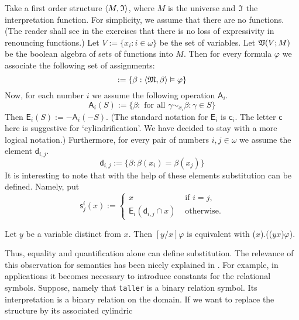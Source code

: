 Take a first order structure $\langle M, \mathfrak{I}\rangle$, where $M$ is the
universe and $\mathfrak{I}$ the interpretation function. For simplicity, we
assume that there are no functions. (The reader shall see in the
exercises that there is no loss of expressivity in renouncing
functions.) Let $V := \{x_i : i \in \omega\}$ be the set of
variables. Let $\mathfrak{V}(V;M)$ be the boolean algebra of sets of
functions into $M$. Then for every formula $\varphi$ we
associate the following set of assignments:
\begin{equation}
[\varphi] := \{\beta : \auf \GM, \beta\zu \vDash \varphi\}
\end{equation}
Now, for each number $i$ we assume the following operation $\mathsf{A}_i$.
\begin{equation}
\mathsf{A}_i(S) := \{\beta : \mbox{ for all }\gamma
\sim_{x_i} \beta: \gamma \in S\}
\end{equation}
Then $\mathsf{E}_i(S) := - \mathsf{A}_i(- S)$. (The standard
notation for $\mathsf{E}_i$ is $\mathsf{c}_i$. The letter
$\mathsf{c}$ here is suggestive for `cylindrification'. We have decided
to stay with a more logical notation.) Furthermore, for every pair of
numbers $i, j \in \omega$ we assume the element $\mathsf{d}_{i,j}$.
\begin{equation}
\mathsf{d}_{i,j} := \{\beta :  \beta(x_i) = \beta(x_j)\}
\end{equation}
It is interesting to note that with the help of these elements
substitution can be defined. Namely, put
\begin{equation}
\mathsf{s}^{i}_{j}(x) := 
    \begin{cases}
    x & \text{ if $i = j$,} \\
    \mathsf{E}_i(\mathsf{d}_{i,j} \cap x)
    & \text{ otherwise.}
    \end{cases}
\end{equation}
\begin{lem}
\label{lem:subst}
Let $y$ be a variable distinct from $x$. Then $[y/x]\varphi$
is equivalent with {\mtt ($x$).(($y$$%
x$)$\varphi$)}.
\end{lem}
Thus, equality and quantification alone
can define substitution. The relevance of this observation for
semantics has been nicely explained in
\cite{dresner:tarski}. For example, in applications
it becomes necessary to introduce constants for the relational
symbols. Suppose, namely that {\tt taller} is a binary relation
symbol. Its interpretation is a binary relation on the domain.
If we want to replace the structure by its associated cylindric
